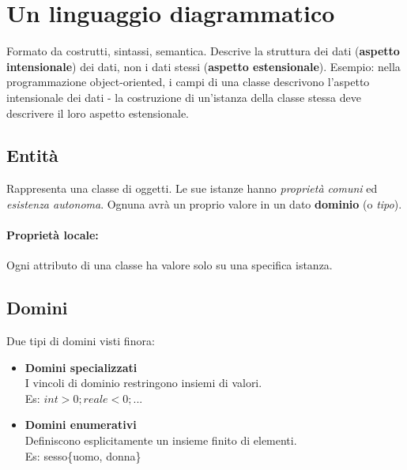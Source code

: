 \section{Un linguaggio diagrammatico}
Formato da costrutti, sintassi, semantica.
Descrive la struttura dei dati (\textbf{aspetto intensionale}) dei dati, non i dati stessi (\textbf{aspetto estensionale}).
Esempio: nella programmazione object-oriented, i campi di una classe descrivono l'aspetto intensionale dei dati - la costruzione di un'istanza della classe stessa deve descrivere il loro aspetto estensionale.

\subsection{Entità}
Rappresenta una classe di oggetti.
Le sue istanze hanno \textit{proprietà comuni} ed \textit{esistenza autonoma}. Ognuna avrà un proprio valore in un dato \textbf{dominio} (o \textit{tipo}). \\
\paragraph{Proprietà locale:} Ogni attributo di una classe ha valore solo su una specifica istanza.

\subsection{Domini}
Due tipi di domini visti finora:
\begin{itemize}
	\item \textbf{Domini specializzati} \hfill \\ I vincoli di dominio restringono insiemi di valori.\\
	Es: $int > 0; reale < 0; ...$
	\item \textbf{Domini enumerativi} \hfill \\ Definiscono esplicitamente un insieme finito di elementi.\\
	Es: sesso\{uomo, donna\}
\end{itemize}